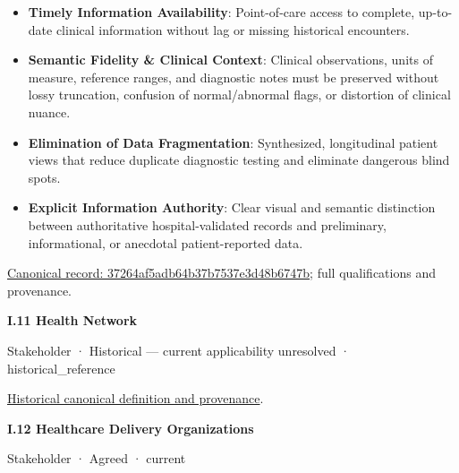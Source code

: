 \begin{itemize}


\item \textbf{Timely Information Availability}: Point-of-care access to complete, up-to-date clinical information without lag or missing historical encounters.

\item \textbf{Semantic Fidelity \& Clinical Context}: Clinical observations, units of measure, reference ranges, and diagnostic notes must be preserved without lossy truncation, confusion of normal/abnormal flags, or distortion of clinical nuance.

\item \textbf{Elimination of Data Fragmentation}: Synthesized, longitudinal patient views that reduce duplicate diagnostic testing and eliminate dangerous blind spots.

\item \textbf{Explicit Information Authority}: Clear visual and semantic distinction between authoritative hospital-validated records and preliminary, informational, or anecdotal patient-reported data.

\end{itemize}

{\footnotesize \href{../../../../continuum/motivation/stakeholder/37264af5adb64b37b7537e3d48b6747b.md}{Canonical record: 37264af5adb64b37b7537e3d48b6747b}; full qualifications and provenance.}\par
\par\medskip{}\label{navigation:I.11}
\textbf{I.11 Health Network}\par

\label{element:55e57c01dfe146a2a225228b31196862}
{\small Stakeholder · Historical — current applicability unresolved · historical\_reference}\par
\href{../../../../continuum/motivation/stakeholder/55e57c01dfe146a2a225228b31196862.md}{Historical canonical definition and provenance}.\par
\par\medskip{}\label{navigation:I.12}
\textbf{I.12 Healthcare Delivery Organizations}\par

\label{element:31a8e1054c02483a9d5e314a91a91364}
{\small Stakeholder · Agreed · current}\par

